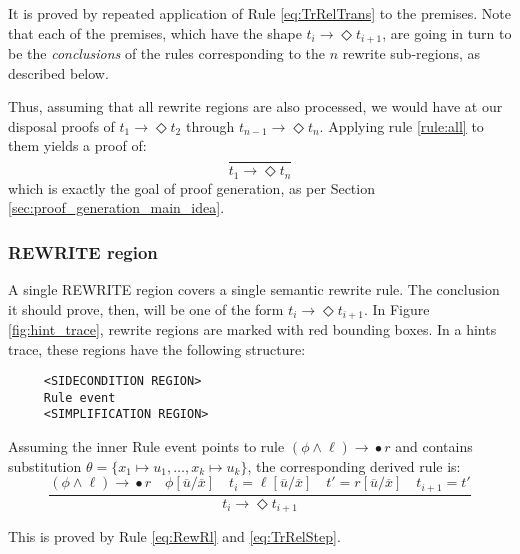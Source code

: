 \documentclass{article}
\theoremstyle{plain}
\theoremstyle{definition}
\begin{document}
It is proved by repeated application of Rule \eqref{eq:TrRelTrans} to the premises. Note that each of the premises, which have the shape $t_i \rightarrow{} \Diamond t_{i+1}$, are going in turn to be the \textit{conclusions} of the rules corresponding to the $n$ rewrite sub-regions, as described below.

Thus, assuming that all rewrite regions are also processed, we would have at our disposal proofs of $t_1 \rightarrow{} \Diamond t_2$ through $t_{n-1} \rightarrow \Diamond t_n$. Applying rule \eqref{rule:all} to them yields a proof of:
\[
\dfrac{}{t_1 \rightarrow{} \Diamond t_n}
\]
which is exactly the goal of proof generation, as per Section \ref{sec:proof_generation_main_idea}.
\subsubsection*{REWRITE region}
A single REWRITE region covers a single semantic rewrite rule. The conclusion it should prove, then, will be one of the form $t_i \rightarrow{} \Diamond t_{i+1}$. In Figure \ref{fig:hint_trace}, rewrite regions are marked with red bounding boxes. In a hints trace, these regions have the following structure:

\begin{verbatim}
     <SIDECONDITION REGION>
     Rule event
     <SIMPLIFICATION REGION>
\end{verbatim}

Assuming the inner Rule event points to rule $(\phi \land \ell) \rightarrow {}\bullet{} r$ and contains substitution $\theta = \{x_1\mapsto u_1,\ldots,x_k\mapsto u_k\}$, the corresponding derived rule is:
\[
\dfrac
{
(\phi \land \ell) \rightarrow {}\bullet{} r \quad  \phi[\overline{u}/\overline{x}] \quad t_i = \ell[\overline{u}/\overline{x}] \quad t' = r[\overline{u}/\overline{x}] \quad t_{i+1} = t'
}
{t_i \rightarrow {}\Diamond t_{i+1}}
\tag{REWRITE}\label{rule:rewrite}
\]

This is proved by Rule \eqref{eq:RewRl} and \eqref{eq:TrRelStep}.
\end{document}
